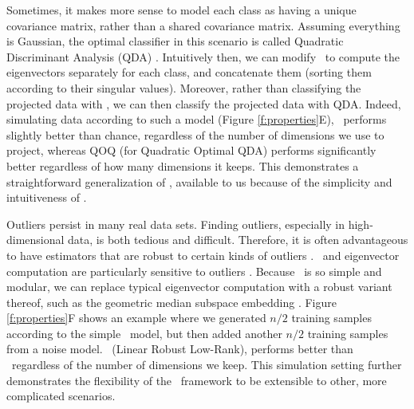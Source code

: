 \documentclass[10pt]{article}
\begin{document}
 Sometimes, it makes more sense to model each class as having a unique covariance matrix, rather than a shared covariance matrix.  Assuming everything is Gaussian, the optimal classifier in this scenario is called  Quadratic Discriminant Analysis (QDA) \cite{Hastie2004}.  Intuitively then, we can modify \Lol~to compute the eigenvectors separately for each class, and concatenate them (sorting them according to their singular values).  Moreover, rather than classifying the projected data with \Lda, we can then classify the projected data with QDA.  Indeed, simulating data according to such a model (Figure \ref{f:properties}E), \Lol~performs slightly better than chance, regardless of the number of dimensions we use to project, whereas QOQ (for Quadratic Optimal QDA) performs significantly better regardless of how many dimensions it keeps. This demonstrates a  straightforward generalization of \Lol, available to us because of the simplicity and intuitiveness of \Lol.

  Outliers persist in many real data sets.  Finding outliers, especially in high-dimensional data, is both tedious and difficult.  Therefore, it is often advantageous to have estimators that are robust to certain kinds of outliers \cite{Huber1981a,Rousseeuw1999a,Ferrari2010a}.  \Pca~and eigenvector computation are particularly sensitive to outliers \cite{Candes2009b}.  Because \Lol~is so simple and modular, we can replace typical eigenvector computation with a robust variant thereof, such as the geometric median subspace embedding \cite{Zhang2014a}.  Figure \ref{f:properties}F shows an example where we generated  $n/2$ training samples according to the simple \Lda~model, but then added another $n/2$ training samples from a noise model.  \Lrl~(Linear Robust Low-Rank), performs better than \Lol~regardless of the number of dimensions we keep. This simulation setting further demonstrates the flexibility of the \Lol~framework to be extensible to other, more complicated scenarios.
\end{document}

